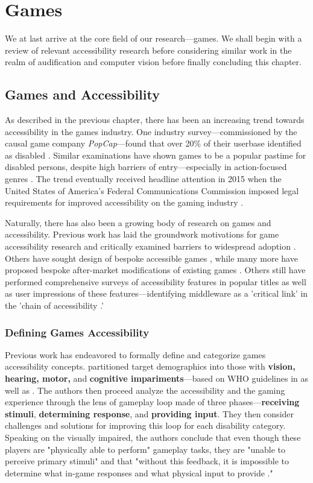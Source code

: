 \documentclass{report}
\newcommand{\tech}[1]{\textbf{#1}}
\begin{document}
\section{Games}
We at last arrive at the core field of our research---games. We shall begin with a review of relevant accessibility research before considering similar work in the realm of audification and computer vision before finally concluding this chapter. 

\subsection{Games and Accessibility}
As described in the previous chapter, there has been an increasing trend towards accessibility in the games industry. One industry survey---commissioned by the causal game company \emph{PopCap}---found that over 20\% of their userbase identified as disabled \cite{Popcap_2008}. Similar examinations have shown games to be a popular pastime for disabled persons, despite high barriers of entry---especially in action-focused genres \cite{yuan2011game}. The trend eventually received headline attention in 2015 when the United States of America's Federal Communications Commission imposed legal requirements for improved accessibility on the gaming industry \cite{Richert}.

Naturally, there has also been a growing body of research on games and accessibility. Previous work has laid the groundwork motivations for game accessibility research \cite{miesenberger2008more} \cite{garber2013game} and critically examined barriers to widespread adoption \cite{porter2013empirical}. Others have sought design of bespoke accessible games \cite{AudioArchery}, while many more have proposed bespoke after-market modifications of existing games \cite{atkinson2006making}. Others still have performed comprehensive surveys of accessibility features in popular titles as well as user impressions of these features---identifying middleware as a 'critical link' in the 'chain of accessibility \cite{porter2013empirical}.'

\subsubsection{Defining Games Accessibility}
Previous work has endeavored to formally define and categorize games accessibility concepts. \cite{yuan2011game} partitioned target demographics into those with \tech{vision, hearing, motor,} and \tech{cognitive impariments}---based on WHO guidelines in \cite{world1980international} as well as \cite{accessguidelines}. The authors then proceed analyze the accessibility and the gaming experience through the lens of gameplay loop made of three phases---\tech{receiving stimuli}, \tech{determining response}, and \tech{providing input}. They then consider challenges and solutions for improving this loop for each disability category. Speaking on the visually impaired, the authors conclude that even though these players are "physically able to perform" gameplay tasks, they are "unable to perceive primary stimuli" and that "without this feedback, it is impossible to determine what in-game responses and what physical input to provide \cite{yuan2011game}." 
\end{document}
